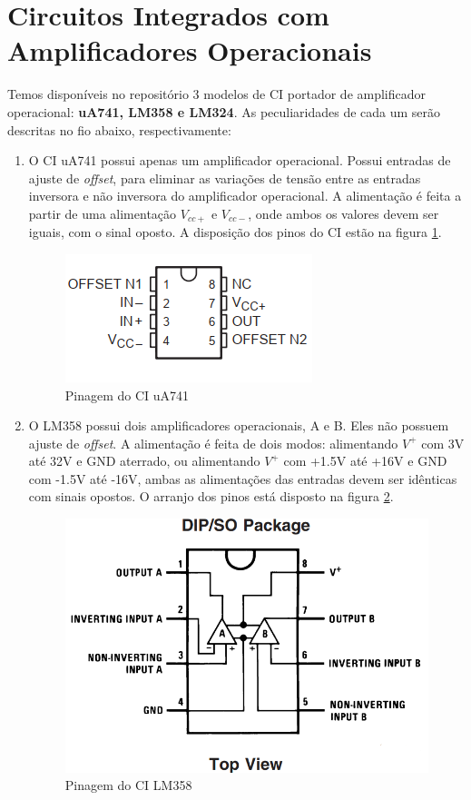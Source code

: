 \section{Circuitos Integrados com Amplificadores Operacionais}
\label{sec:circuitos_integrados}
Temos disponíveis no repositório 3 modelos de CI portador de amplificador operacional: \textbf{uA741, LM358 e LM324}. As peculiaridades de cada um serão descritas no fio abaixo, respectivamente:
\begin{enumerate}
    \item O CI uA741 possui apenas um amplificador operacional. Possui entradas de ajuste de \emph{offset}, para eliminar as variações de tensão entre as entradas inversora e não inversora do amplificador operacional. A alimentação é feita a partir de uma alimentação $V_{cc+}$ e $V_{cc-}$, onde ambos os valores devem ser iguais, com o sinal oposto. A disposição dos pinos do CI estão na figura \ref{fig:ua741}.
    \begin{figure}[H]
        \centering
        \includegraphics{imagens/ua741.png}
        \caption{Pinagem do CI uA741}
        \label{fig:ua741}
    \end{figure}
    
    \item O LM358 possui dois amplificadores operacionais, A e B. Eles não possuem ajuste de \emph{offset}. A alimentação é feita de dois modos: alimentando $V^+$ com 3V até 32V e GND aterrado, ou alimentando $V^+$ com +1.5V até +16V e GND com -1.5V até -16V, ambas as alimentações das entradas devem ser idênticas com sinais opostos. O arranjo dos pinos está disposto na figura \ref{fig:lm358}.
    \begin{figure}[H]
        \centering
        \includegraphics[width=.4\linewidth]{imagens/LM358.png}
        \caption{Pinagem do CI LM358}
        \label{fig:lm358}
    \end{figure}
    

\end{enumerate}
